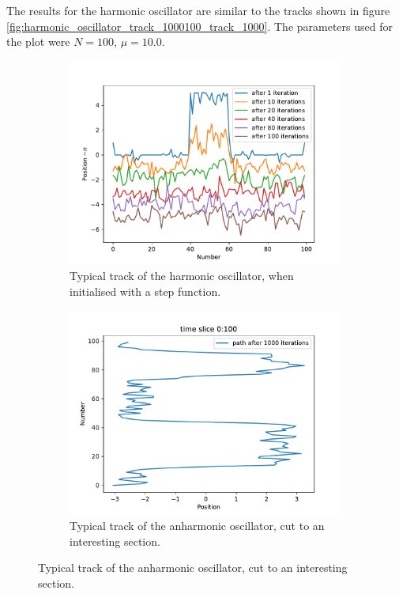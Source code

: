 \documentclass{scrartcl}
\begin{document}
		The results for the harmonic oscillator are similar to the tracks shown in figure \ref{fig:harmonic_oscillator_track_1000100_track_1000}.
		The parameters used for the plot were $N=100$, $\mu = 10.0$.
		\begin{figure}[H]
			\centering
				\begin{subfigure}[c]{0.49\textwidth}
					\includegraphics[width=\textwidth]{../imgs/harmonic_oscillator_track/track_100100_step_track_shifted_double.pdf}
					\caption{Typical track of the harmonic oscillator, when initialised with a step function.}
					\label{fig:harmonic_oscillator_track_100100_100100_step_track_shifted_double}
				\end{subfigure}
				\begin{subfigure}[c]{0.49\textwidth}
					\includegraphics[width=\textwidth]{../imgs/anharmonic_oscillator_track/track_100010005_track_pretty_1000.pdf}
					\caption{Typical track of the anharmonic oscillator, cut to an interesting section.}
					\label{fig:anharmonic_oscillator_track_100010005_track_pretty_1000}
				\end{subfigure}
		\end{figure}
\end{document}

